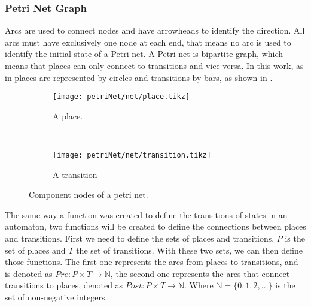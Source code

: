 \subsubsection{Petri Net Graph}
\label{sec:petrinetGraph}
Arcs are used to connect
nodes and have arrowheads to identify the direction. All arcs must have exclusively one node at each end, that means
no arc is used to identify the initial state of a Petri net. A Petri net is
bipartite graph, which means that places can only connect to transitions and vice
versa. In this work, as in \cite{david2005discrete} places are represented by
circles and transitions by bars, as shown in . 
\begin{figure}[H]
  \centering
  \begin{subfigure}[t]{0.45\textwidth}
  \centering
  \texttt{[image: petriNet/net/place.tikz]}
  \caption{A place.}
\end{subfigure}
~
\begin{subfigure}[t]{0.5\textwidth}
  \centering
  \texttt{[image: petriNet/net/transition.tikz]}
  \caption{A transition}
\end{subfigure}
\caption{Component nodes of a petri net.}
\label{fig:componentsPetriNet}
\end{figure}

The same way a function was created to define the transitions of states in an
automaton, two functions will be created to define the connections between places
and transitions. First we need to define the sets of places and transitions. $P$
is the set of places and $T$ the set of transitions. With these two sets, we can
then define those functions. The first one represents the arcs
from places to transitions, and is denoted as $Pre: P \times T \rightarrow
\mathbb{N}$, the second one represents the arcs that connect transitions to places, denoted
as $Post: P \times T \rightarrow \mathbb{N}$. Where $\mathbb{N}=\{0,1,2,\dots\}$
is the set of non-negative integers.



